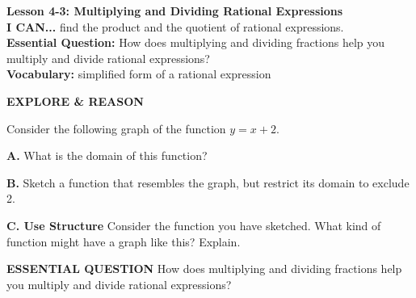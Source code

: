 \documentclass{article}
\newenvironment{lesson-meta}{}{}
\newenvironment{model-discuss}{}{}
\newenvironment{concept-box}{}{}
\begin{document}
\begin{lesson-meta}
\textbf{Lesson 4-3: Multiplying and Dividing Rational Expressions} \\
\textbf{I CAN...} find the product and the quotient of rational expressions. \\
\textbf{Essential Question:} How does multiplying and dividing fractions help you multiply and divide rational expressions? \\
\textbf{Vocabulary:} simplified form of a rational expression
\end{lesson-meta}

\begin{model-discuss}
\textbf{EXPLORE \& REASON}

Consider the following graph of the function $y = x + 2$.


\textbf{A.} What is the domain of this function?

\textbf{B.} Sketch a function that resembles the graph, but restrict its domain to exclude 2.

\textbf{C. Use Structure} Consider the function you have sketched. What kind of function might have a graph like this? Explain.
\end{model-discuss}

\begin{concept-box}
\textbf{ESSENTIAL QUESTION}
How does multiplying and dividing fractions help you multiply and divide rational expressions?
\end{concept-box}
\end{document}
